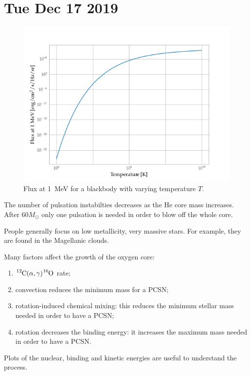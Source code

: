 \documentclass[main.tex]{subfiles}
\begin{document}
\section*{Tue Dec 17 2019}

\begin{figure}[ht]
    \centering
    \includegraphics[width=\textwidth]{figures/flux_1_MeV.png}
    \caption{Flux at \SI{1}{MeV} for a blackbody with varying temperature \(T\).}
    \label{fig:flux-1-MeV}
\end{figure}

The number of pulsation instabilties decreases as the He core mass increases. After \(60 M_{\odot}\) only one pulsation is needed in order to blow off the whole core. 

People generally focus on low metallicity, very massive stars. For example, they are found in the Magellanic clouds. 

Many factors affect the growth of the oxygen core: 
\begin{enumerate}
    \item \(\ce{^{12}C}(\alpha , \gamma ) \ce{^{16}O}\) rate;
    \item convection reduces the minimum mass for a PCSN;
    \item rotation-induced chemical mixing: this reduces the minimum stellar mass needed in order to have a PCSN;
    \item rotation decreases the binding energy: it increases the maximum mass needed in order to have a PCSN.
\end{enumerate}

Plots of the nuclear, binding and kinetic energies are useful to understand the process. 
\end{document}
